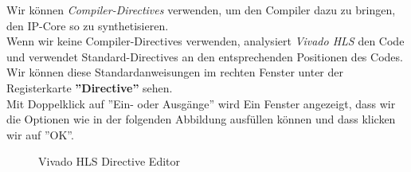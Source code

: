\documentclass[a4paper]{report}
\begin{document}
Wir können \textit{Compiler-Directives} verwenden, um den Compiler dazu zu bringen, den IP-Core so zu synthetisieren.\\

Wenn wir keine Compiler-Directives verwenden, analysiert \textit{Vivado HLS} den Code und verwendet Standard-Directives an den entsprechenden Positionen des Codes. Wir können diese Standardanweisungen im rechten Fenster unter der Registerkarte  \textbf{''Directive''} sehen.\\

Mit Doppelklick auf ''Ein- oder Ausgänge'' wird Ein Fenster angezeigt, dass wir die Optionen wie in der folgenden Abbildung ausfüllen können und dass klicken wir auf ''OK''.\\


\begin{figure}[H]
\centering
{}
\caption{Vivado HLS Directive Editor}
\label{fig:Vivado_HLS_Directive_Editor}
\end{figure}
\end{document}
